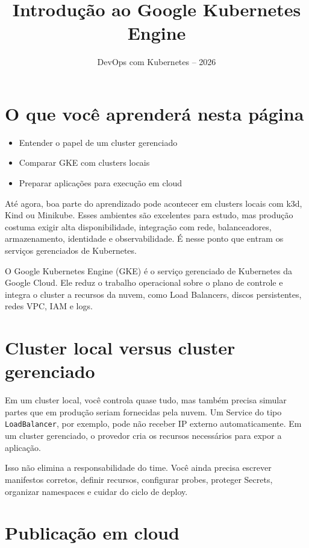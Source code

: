 \documentclass[11pt,a4paper]{article}
\title{\color{secondary}\Huge\textbf{Introdução ao Google Kubernetes Engine}}
\author{\color{primary}DevOps com Kubernetes -- 2026}
\date{}
\begin{document}
\maketitle


\section*{\color{primary}O que você aprenderá nesta página}
\begin{itemize}
\item Entender o papel de um cluster gerenciado
\item Comparar GKE com clusters locais
\item Preparar aplicações para execução em cloud
\end{itemize}

Até agora, boa parte do aprendizado pode acontecer em clusters locais com k3d, Kind ou Minikube. Esses ambientes são excelentes para estudo, mas produção costuma exigir alta disponibilidade, integração com rede, balanceadores, armazenamento, identidade e observabilidade. É nesse ponto que entram os serviços gerenciados de Kubernetes.

O Google Kubernetes Engine (GKE) é o serviço gerenciado de Kubernetes da Google Cloud. Ele reduz o trabalho operacional sobre o plano de controle e integra o cluster a recursos da nuvem, como Load Balancers, discos persistentes, redes VPC, IAM e logs.

\section*{\color{primary}Cluster local versus cluster gerenciado}

Em um cluster local, você controla quase tudo, mas também precisa simular partes que em produção seriam fornecidas pela nuvem. Um Service do tipo \texttt{LoadBalancer}, por exemplo, pode não receber IP externo automaticamente. Em um cluster gerenciado, o provedor cria os recursos necessários para expor a aplicação.

Isso não elimina a responsabilidade do time. Você ainda precisa escrever manifestos corretos, definir recursos, configurar probes, proteger Secrets, organizar namespaces e cuidar do ciclo de deploy.

\section*{\color{primary}Publicação em cloud}
\end{document}
